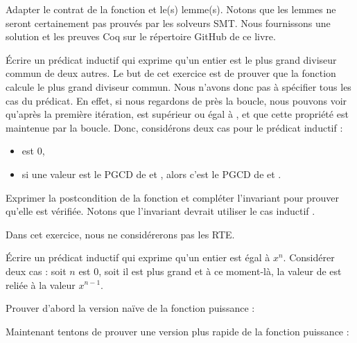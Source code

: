 

Adapter le contrat de la fonction et le(s) lemme(s). Notons que les lemmes ne
seront certainement pas prouvés par les solveurs SMT. Nous fournissons une solution
et les preuves Coq sur le répertoire GitHub de ce livre.





Écrire un prédicat inductif qui exprime qu'un entier est le plus grand diviseur
commun de deux autres. Le but de cet exercice est de prouver que la fonction
 calcule le plus grand diviseur commun. Nous n'avons donc pas
à spécifier tous les cas du prédicat. En effet, si nous regardons de près la boucle,
nous pouvons voir qu'après la première itération,  est supérieur ou
égal à , et que cette propriété est maintenue par la boucle. Donc,
considérons deux cas pour le prédicat inductif :
\begin{itemize}
\item {} est 0,
\item si une valeur  est le PGCD de  et ,
      alors c'est le PGCD de  et .
\end{itemize}




Exprimer la postcondition de la fonction et compléter l'invariant pour prouver
qu'elle est vérifiée. Notons que l'invariant devrait utiliser le cas inductif
.





Dans cet exercice, nous ne considérerons pas les RTE.


Écrire un prédicat inductif qui exprime qu'un entier  est égal
à $x^n$. Considérer deux cas : soit $n$ est 0, soit il est plus grand et à ce
moment-là, la valeur de  est reliée à la valeur $x^{n-1}$.




Prouver d'abord la version naïve de la fonction puissance :




Maintenant tentons de prouver une version plus rapide de la fonction puissance :




